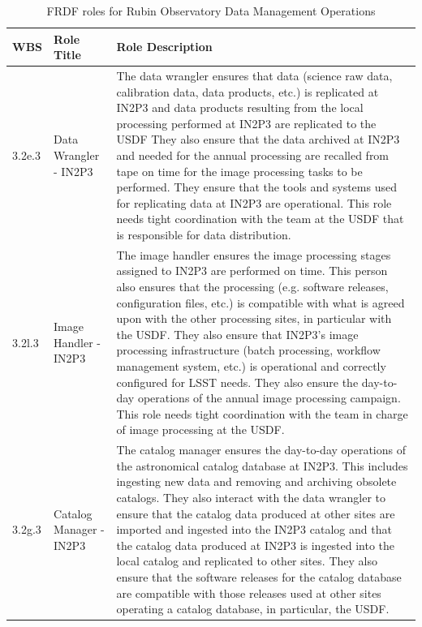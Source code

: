 \normalsize \begin{longtable} {|p{}|p{}|p{}|} \caption{FRDF roles for Rubin Observatory Data Management Operations \label{tab:frdfroles}}\\ 
\hline 
\textbf{WBS}&\textbf{Role Title}&\textbf{Role Description} \\ \hline
{3.2e.3}&{Data Wrangler - IN2P3}&{The data wrangler ensures that data (science raw data, calibration data, data products, etc.) is replicated at IN2P3 and data products resulting from the local processing performed at IN2P3 are replicated to the USDF They also ensure that the data archived at IN2P3 and needed for the annual processing are recalled from tape on time for the image processing tasks to be performed. They ensure that the tools and systems used for replicating data at IN2P3 are operational. This role needs tight coordination with the team at the USDF that is responsible for data distribution.} \\ \hline
{3.2l.3}&{Image Handler - IN2P3}&{The image handler ensures the image processing stages assigned to IN2P3 are performed on time. This person also ensures that the processing (e.g. software releases, configuration files, etc.) is compatible with what is agreed upon with the other processing sites, in particular with the USDF. They also ensure that IN2P3's image processing infrastructure (batch processing, workflow management system, etc.) is operational and correctly configured for LSST needs. They also ensure the day-to-day operations of the annual image processing campaign. This role needs tight coordination with the team in charge of image processing at the USDF.} \\ \hline
{3.2g.3}&{Catalog Manager - IN2P3}&{The catalog manager ensures the day-to-day operations of the astronomical catalog database at IN2P3. This includes ingesting new data and removing and archiving obsolete catalogs. They also interact with the data wrangler to ensure that the catalog data produced at other sites are imported and ingested into the IN2P3 catalog and that the catalog data produced at IN2P3 is ingested into the local catalog and replicated to other sites. They also ensure that the software releases for the catalog database are compatible with those releases used at other sites operating a catalog database, in particular, the USDF.} \\ \hline
\end{longtable} \normalsize
